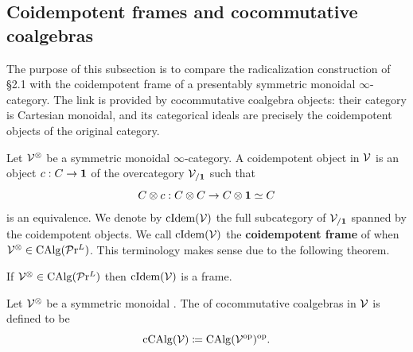 \documentclass[10pt,a4paper,oneside]{article}
\begin{document}


\subsection{Coidempotent frames and cocommutative coalgebras}
The purpose of this subsection is to compare the radicalization construction of §2.1 with the coidempotent frame of a presentably symmetric monoidal $\infty$-category. The link is provided by cocommutative coalgebra objects: their category is Cartesian monoidal, and its categorical ideals are precisely the coidempotent objects of the original category.

\begin{de}
Let $\mathcal{V}^\otimes$ be a symmetric monoidal $\infty$-category.
A coidempotent object in $\mathcal{V}$ is an object $c: C \rightarrow \mathbf{1}$ of the overcategory $\mathcal{V}_{/ \mathbf{1}}$ such that \[
C \otimes c: C \otimes C \rightarrow C \otimes \mathbf{1} \simeq C
\]
is an equivalence. We denote by $\operatorname{cIdem}(\mathcal{V})$ the full subcategory of $\mathcal{V}_{/\mathbf{1}}$ spanned by the coidempotent objects. We call $\operatorname{cIdem}(\mathcal{V})$ the \textbf{coidempotent frame} of \mcv when $\mathcal{V}^\otimes\in \operatorname{CAlg}(\mathcal{P}\mathrm{r}^L)$. This terminology makes sense due to the following theorem.
\end{de}

\begin{thm}\label{shvsmadj}
If $\mathcal{V}^\otimes\in \operatorname{CAlg}(\mathcal{P}\mathrm{r}^L)$ then $\operatorname{cIdem}(\mathcal{V})$ is a frame.
\end{thm}


\begin{de}
Let $\mathcal{V}^\otimes$ be a symmetric monoidal \infcat. The \infcat of cocommutative coalgebras in $\mathcal{V}$ is defined to be 
$$\operatorname{cCAlg}(\mathcal{V}) \coloneqq \operatorname{CAlg}(\mathcal{V}^{\operatorname{op}})^{\operatorname{op}}.$$
\end{de}
\end{document}
